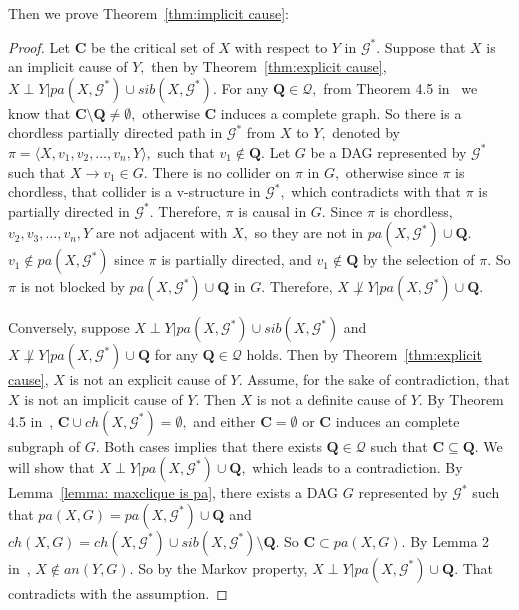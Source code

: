 \documentclass{article}
\begin{document}
Then we prove Theorem~\ref{thm:implicit cause}:
\begin{proof}
Let $\mathbf{C}$ be the critical set of $X$ with respect to $Y$ in $\mathcal{G}^*.$ Suppose that $X$ is an implicit cause of $Y,$ then by Theorem~\ref{thm:explicit cause}, $X\perp Y|pa(X,\mathcal{G}^*)\cup sib(X,\mathcal{G}^*).$ For any $\mathbf{Q}\in \mathcal{Q},$ from Theorem 4.5 in~\citep{zuo2022counterfactual} we know that $\mathbf{C}\setminus \mathbf{Q}\neq \emptyset,$ otherwise $\mathbf{C}$ induces a complete graph. So there is a chordless partially directed path in $\mathcal{G}^*$ from $X$ to $Y,$ denoted by $\pi=\langle X,v_1,v_2,\dots,v_n,Y\rangle,$ such that $v_1\not\in \mathbf{Q}.$ Let $G$ be a DAG represented by $\mathcal{G}^*$ such that $X\to v_1\in G.$ There is no collider on $\pi$ in $G,$ otherwise since $\pi$ is chordless, that collider is a v-structure in $\mathcal{G}^*,$ which contradicts with that $\pi$ is partially directed in $\mathcal{G}^*.$ Therefore, $\pi$ is causal in $G.$ Since $\pi$ is chordless, $v_2,v_3,\dots,v_n,Y$ are not adjacent with $X,$ so they are not in $pa(X,\mathcal{G}^*)\cup \mathbf{Q}.$ $v_1\not\in pa(X,\mathcal{G}^*)$ since $\pi$ is partially directed, and $v_1\not\in \mathbf{Q}$ by the selection of $\pi.$ So $\pi$ is not blocked by $pa(X,\mathcal{G}^*)\cup \mathbf{Q}$ in $G.$ Therefore, $X\not\perp Y|pa(X,\mathcal{G}^*)\cup \mathbf{Q}.$

Conversely, suppose $X\perp Y| pa(X,\mathcal{G}^*)\cup sib(X,\mathcal{G}^*)$ and $X\not\perp Y|pa(X,\mathcal{G}^*)\cup \mathbf{Q}$ for any $\mathbf{Q}\in \mathcal{Q}$ holds. Then by Theorem~\ref{thm:explicit cause}, $X$ is not an explicit cause of $Y.$ Assume, for the sake of contradiction, that $X$ is not an implicit cause of $Y.$ Then $X$ is not a definite cause of $Y.$ By Theorem 4.5 in~\citep{zuo2022counterfactual}, $\mathbf{C}\cup ch(X,\mathcal{G}^*)=\emptyset,$ and either $\mathbf{C}=\emptyset$ or $\mathbf{C}$ induces an complete subgraph of $G.$ Both cases implies that there exists $\mathbf{Q}\in\mathcal{Q}$ such that $\mathbf{C}\subseteq \mathbf{Q}.$ We will show that $X\perp Y|pa(X,\mathcal{G}^*)\cup \mathbf{Q},$ which leads to a contradiction. By Lemma~\ref{lemma: maxclique is pa}, there exists a DAG $G$ represented by $\mathcal{G}^*$ such that $pa(X,G)=pa(X,\mathcal{G}^*)\cup \mathbf{Q}$ and $ch(X,G)=ch(X,\mathcal{G}^*)\cup sib(X,\mathcal{G}^*)\setminus \mathbf{Q}.$ So $\mathbf{C}\subset pa(X,G).$ By Lemma 2 in~\citep{fang2020ida}, $X\not\in an(Y,G).$ So by the Markov property, $X\perp Y|pa(X,\mathcal{G}^*)\cup \mathbf{Q}.$ That contradicts with the assumption. 

\end{proof}
\end{document}
